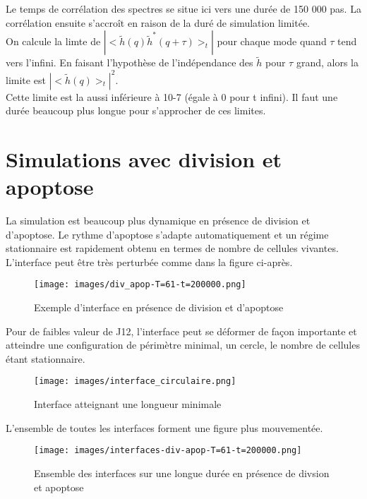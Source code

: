 \documentclass[11pt,a4paper]{article}
\begin{document}
Le temps de corrélation des spectres se situe ici vers une durée de 150 000 pas. La corrélation ensuite s'accroît en raison de la duré de simulation limitée.\\

On calcule la limte de $|<\tilde{h}(q) {\tilde{h}}^*(q+\tau)>_t|$ pour chaque mode quand $\tau$ tend vers l'infini. En faisant l'hypothèse de l'indépendance des $\tilde{h}$ pour $\tau$ grand, alors la limite est $|<\tilde{h}(q)>_t|^2$.\\
Cette limite est la aussi inférieure à 10-7 (égale à 0 pour t infini). Il faut une durée beaucoup plus longue pour s'approcher de ces limites.

\section{Simulations avec division et apoptose}

La simulation est beaucoup plus dynamique en présence de division et d'apoptose. Le rythme d'apoptose s'adapte automatiquement et un régime stationnaire est rapidement obtenu en termes de nombre de cellules vivantes.\\
L'interface peut être très perturbée comme dans la figure ci-après.

\begin{figure}[H]
\begin{center}
\texttt{[image: images/div\_apop-T=61-t=200000.png]}
\caption{Exemple d'interface en présence de division et d'apoptose}
\label{mafigure}
\end{center}
\end{figure}

Pour de faibles valeur de J12, l'interface peut se déformer de façon importante et atteindre une configuration de périmètre minimal, un cercle, le nombre de cellules étant stationnaire.\\

\begin{figure}[H]
\begin{center}
\texttt{[image: images/interface\_circulaire.png]}
\caption{Interface atteignant une longueur minimale}
\label{mafigure}
\end{center}
\end{figure}


L'ensemble de toutes les interfaces forment une figure plus mouvementée.

\begin{figure}[H]
\begin{center}
\texttt{[image: images/interfaces-div-apop-T=61-t=200000.png]}
\caption{Ensemble des interfaces sur une longue durée en présence de divsion et apoptose}
\label{mafigure}
\end{center}
\end{figure}
\end{document}
